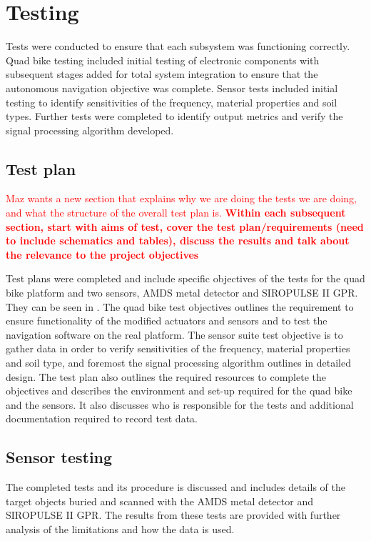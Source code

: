 \documentclass[main.tex]{subfiles}
\begin{document}
\chapter{Testing}
Tests were conducted to ensure that each subsystem was functioning correctly. Quad bike testing included initial testing of electronic components with subsequent stages added for total system integration to ensure that the autonomous navigation objective was complete. Sensor tests included initial testing to identify sensitivities of the frequency, material properties and soil types. Further tests were completed to identify output metrics and verify the signal processing algorithm developed. 

\section{Test plan}
\textcolor{red}{Maz wants a new section that explains why we are doing the tests we are doing, and what the structure of the overall test plan is. \textbf{Within each subsequent section, start with aims of test, cover the test plan/requirements (need to include schematics and tables), discuss the results and talk about the relevance to the project objectives}}


Test plans were completed and include specific objectives of the tests for the quad bike platform and two sensors, AMDS metal detector and SIROPULSE II GPR. They can be seen in . The quad bike test objectives outlines the requirement to ensure functionality of the modified actuators and sensors and to test the navigation software on the real platform. The sensor suite test objective is to gather data in order to verify sensitivities of the frequency, material properties and soil type, and foremost the signal processing algorithm outlines in detailed design. The test plan also outlines the required resources to complete the objectives and describes the environment and set-up required for the quad bike and the sensors. It also discusses who is responsible for the tests and additional documentation required to record test data. 

\section{Sensor testing}
The completed tests and its procedure is discussed and includes details of the target objects buried and scanned with the AMDS metal detector and SIROPULSE II GPR. The results from these tests are provided with further analysis of the limitations and how the data is used. 
\end{document}
